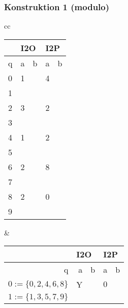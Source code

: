 \begin{frame}
  \frametitle{Konstruktion 1 (modulo)}
  \centering
  \begin{tabular}{cc}
    \begin{tabular}{|l|l|l|l|l|}
      \hline
      & \multicolumn{2}{l|}{I2O} & \multicolumn{2}{l|}{I2P} \\\hline
    q & a           & b          & a           & b          \\\hline\hline
    \cellcolor[HTML]{DAE8FC}0  & 1            &            &  4           &            \\\hline
    1 &             &            &             &            \\\hline
    \cellcolor[HTML]{DAE8FC}2 &  3           &            & 2            &            \\\hline
    3 &             &            &             &            \\\hline
    \cellcolor[HTML]{DAE8FC}4 &  1           &            & 2            &            \\\hline
    5 &             &            &             &            \\\hline
    \cellcolor[HTML]{DAE8FC}6 &  2           &            & 8            &            \\\hline
    7 &             &            &             &            \\\hline
    \cellcolor[HTML]{DAE8FC}8 &  2           &            & 0            &            \\\hline
    9 &             &            &             &           \\\hline
    \end{tabular}
    &
    \begin{tabular}{|r|r|r|r|r|}
      \hline
      & \multicolumn{2}{l|}{I2O} & \multicolumn{2}{l|}{I2P} \\\hline
    q & a           & b          & a           & b          \\\hline\hline
    \cellcolor[HTML]{DAE8FC}$0:=\{0,2,4,6,8\}$  & Y            &           & $0$            &            \\\hline
    $1:=\{1,3,5,7,9\}$ &             &            &             &            \\\hline
    \end{tabular}
    \end{tabular}
\end{frame}

